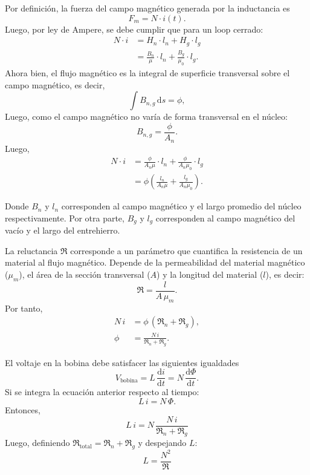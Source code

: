 \documentclass[
  11pt,
  letterpaper,
   addpoints,
   answers
  ]{exam}
\newcommand{\Rel}{\mathfrak{R}} %
\begin{document}
\begin{questions}
Por definición, la fuerza del campo magnético generada por la inductancia es
\begin{equation*}
  F_m = N \cdot i(t).
\end{equation*}
Luego, por ley de Ampere, se debe cumplir que para un loop cerrado:
\begin{align*}
  N \cdot i
  &= H_n \cdot l_n + H_g \cdot l_g \\
  &= \frac{B_n}{\mu} \cdot l_n + \frac{B_g}{\mu_0} \cdot l_g .
\end{align*}
Ahora bien, el flujo magnético es la integral de superficie transversal sobre el campo magnético, es decir,
\begin{equation*}
  \int B_{n,g}\, \mathrm{d}s = \phi,
\end{equation*}
Luego, como el campo magnético no varía de forma transversal en el núcleo:
\begin{equation*}
  B_{n,g} = \frac{\phi}{A_n}.
\end{equation*}
Luego,
\begin{align*}
  N \cdot i
  &= \frac{\phi}{A_n \mu} \cdot l_n + \frac{\phi}{A_n \mu_0} \cdot l_g \\
  &= \phi\!\left(\frac{l_n}{A_n \mu} + \frac{l_g}{A_n \mu_0}\right).
\end{align*}

Donde $B_n$ y $l_n$ corresponden al campo magnético y el largo promedio del núcleo respectivamente. Por otra parte, $B_g$ y $l_g$ corresponden al campo magnético del vacío y el largo del entrehierro.

La reluctancia $\Rel$ corresponde a un parámetro que cuantifica la resistencia de un material al flujo magnético. Depende de la permeabilidad del material magnético ($\mu_m$), el área de la sección transversal ($A$) y la longitud del material ($l$), es decir:
\begin{equation}
  \Rel = \frac{l}{A\,\mu_m}.
  \label{eq:reluctancia}
\end{equation}
Por tanto,
\begin{align*}
  N\,i &= \phi\,(\Rel_n + \Rel_g), \\
  \phi &= \frac{N\,i}{\Rel_n + \Rel_g}.
\end{align*}

El voltaje en la bobina debe satisfacer las siguientes igualdades
\begin{equation*}
  V_{\text{bobina}} = L\,\frac{\mathrm{d}i}{\mathrm{d}t}
  = N\,\frac{\mathrm{d}\Phi}{\mathrm{d}t}.
\end{equation*}
Si se integra la ecuación anterior respecto al tiempo:
\begin{equation*}
  L\,i = N\,\Phi.
\end{equation*}
Entonces,
\begin{equation*}
  L\,i = N\, \frac{N\, i}{\Rel_n + \Rel_g}
\end{equation*}
Luego, definiendo $\Rel_{\text{total}} = \Rel_n + \Rel_g$ y despejando $L$:
\begin{equation}
  L = \frac{N^2}{\Rel}
  \label{eq:LfromR}
\end{equation}


\end{questions}
\end{document}
